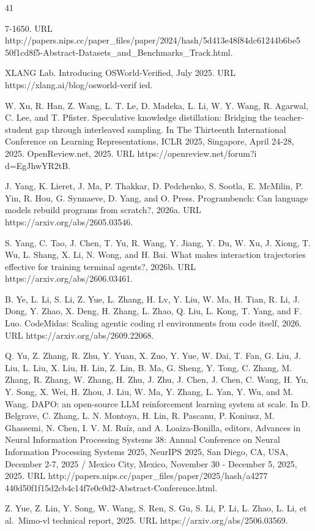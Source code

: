 \documentclass[
  10
]{article}
\begin{document}
41

7-1650. URL
http://papers.nips.cc/paper\_files/paper/2024/hash/5d413e48f84dc61244b6be5
50f1cd8f5-Abstract-Datasets\_and\_Benchmarks\_Track.html.

XLANG Lab. Introducing OSWorld-Verified, July 2025. URL
https://xlang.ai/blog/osworld-verif ied.

W. Xu, R. Han, Z. Wang, L. T. Le, D. Madeka, L. Li, W. Y. Wang, R.
Agarwal, C. Lee, and T. Pfister. Speculative knowledge distillation:
Bridging the teacher-student gap through interleaved sampling. In The
Thirteenth International Conference on Learning Representations, ICLR
2025, Singapore, April 24-28, 2025. OpenReview.net, 2025. URL
https://openreview.net/forum?i d=EgJhwYR2tB.

J. Yang, K. Lieret, J. Ma, P. Thakkar, D. Pedchenko, S. Sootla, E.
McMilin, P. Yin, R. Hou, G. Synnaeve, D. Yang, and O. Press.
Programbench: Can language models rebuild programs from scratch?, 2026a.
URL https://arxiv.org/abs/2605.03546.

S. Yang, C. Tao, J. Chen, T. Yu, R. Wang, Y. Jiang, Y. Du, W. Xu, J.
Xiong, T. Wu, L. Shang, X. Li, N. Wong, and H. Bai. What makes
interaction trajectories effective for training terminal agents?, 2026b.
URL https://arxiv.org/abs/2606.03461.

B. Ye, L. Li, S. Li, Z. Yue, L. Zhang, H. Lv, Y. Liu, W. Ma, H. Tian, R.
Li, J. Dong, Y. Zhao, X. Deng, H. Zhang, L. Zhao, Q. Liu, L. Kong, T.
Yang, and F. Luo. CodeMidas: Scaling agentic coding rl environments from
code itself, 2026. URL https://arxiv.org/abs/2609.22068.

Q. Yu, Z. Zhang, R. Zhu, Y. Yuan, X. Zuo, Y. Yue, W. Dai, T. Fan, G.
Liu, J. Liu, L. Liu, X. Liu, H. Lin, Z. Lin, B. Ma, G. Sheng, Y. Tong,
C. Zhang, M. Zhang, R. Zhang, W. Zhang, H. Zhu, J. Zhu, J. Chen, J.
Chen, C. Wang, H. Yu, Y. Song, X. Wei, H. Zhou, J. Liu, W. Ma, Y. Zhang,
L. Yan, Y. Wu, and M. Wang. DAPO: an open-source LLM reinforcement
learning system at scale. In D. Belgrave, C. Zhang, L. N. Montoya, H.
Lin, R. Pascanu, P. Koniusz, M. Ghassemi, N. Chen, I. V. M. Ruíz, and A.
Loaiza-Bonilla, editors, Advances in Neural Information Processing
Systems 38: Annual Conference on Neural Information Processing Systems
2025, NeurIPS 2025, San Diego, CA, USA, December 2-7, 2025 / Mexico
City, Mexico, November 30 - December 5, 2025, 2025. URL
http://papers.nips.cc/paper\_files/paper/2025/hash/a4277
440d50f1f15d2cb4c14f7e0c0d2-Abstract-Conference.html.

Z. Yue, Z. Lin, Y. Song, W. Wang, S. Ren, S. Gu, S. Li, P. Li, L. Zhao,
L. Li, et al.~Mimo-vl technical report, 2025. URL
https://arxiv.org/abs/2506.03569.
\end{document}

